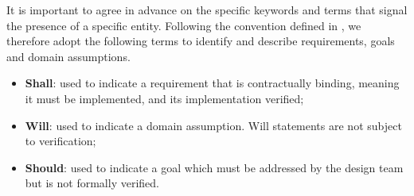 It is important to agree in advance on the specific keywords and terms that signal the presence of a specific entity. Following the convention defined in \cite{iso_ieee_standard}, we therefore adopt the following terms to identify and describe requirements, goals and domain assumptions.

\begin{itemize}
    \item \textbf{Shall}: used to indicate a requirement that is contractually binding, meaning it must be implemented, and its implementation verified;
    \item \textbf{Will}: used to indicate a domain assumption.  Will statements are not subject to verification;
    \item \textbf{Should}: used to indicate a goal which must be addressed by the design team but is not formally verified.
\end{itemize}

